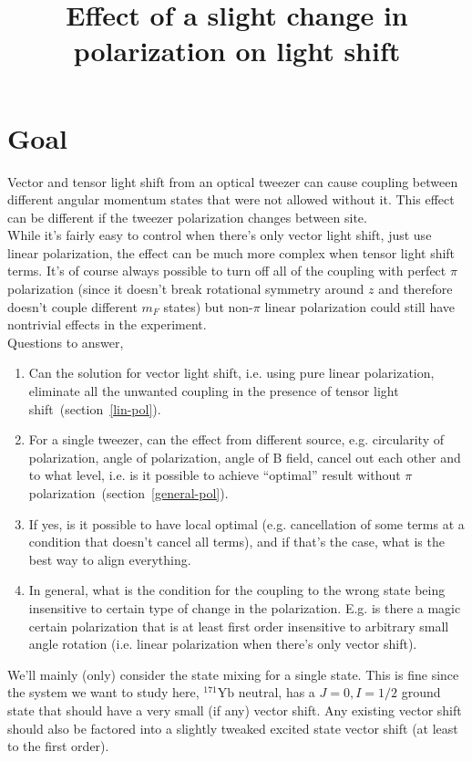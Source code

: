 \documentclass[10pt,fleqn]{article}
\title{Effect of a slight change in polarization on light shift}
\begin{document}
\maketitle

\section{Goal}
Vector and tensor light shift from an optical tweezer can cause coupling
between different angular momentum states that were not allowed without it.
This effect can be different if the tweezer polarization changes between site.\\

While it's fairly easy to control when there's only vector light shift,
just use linear polarization, the effect can be much more complex
when tensor light shift terms. It's of course always possible to turn off
all of the coupling with perfect $\pi$ polarization (since it doesn't break
rotational symmetry around $z$ and therefore doesn't couple different $m_F$ states)
but non-$\pi$ linear polarization could still have nontrivial
effects in the experiment.\\

Questions to answer,
\begin{enumerate}
\item Can the solution for vector light shift, i.e. using pure linear polarization,
  eliminate all the unwanted coupling in the presence of
  tensor light shift~(section~\ref{lin-pol}).
\item For a single tweezer, can the effect from different source,
  e.g. circularity of polarization, angle of polarization, angle of B field,
  cancel out each other and to what level,
  i.e. is it possible to achieve ``optimal'' result
  without $\pi$ polarization~(section~\ref{general-pol}).
\item If yes, is it possible to have local optimal
  (e.g. cancellation of some terms at a condition that doesn't cancel all terms),
  and if that's the case, what is the best way to align everything.
\item In general, what is the condition for the coupling to the wrong state
  being insensitive to certain type of change in the polarization.
  E.g. is there a magic certain polarization that is at least first order insensitive
  to arbitrary small angle rotation
  (i.e. linear polarization when there's only vector shift).
\end{enumerate}

We'll mainly (only) consider the state mixing for a single state.
This is fine since the system we want to study here, $^{171}\mathrm{Yb}$ neutral,
has a $J=0, I=1/2$ ground state that should have a very small (if any) vector
shift. Any existing vector shift should also be factored
into a slightly tweaked excited state vector shift (at least to the first order).\\
\end{document}
